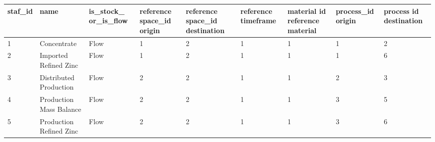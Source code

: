\documentclass[ %
                    author={Tom Jager},
                supervisor={Dr. Daniel Schien},
                    degree={MEng},
                     title={A Bayesian Inference Engine for Calibrating Uncertainty over UMIS Structured MFA Systems},
                  subtitle={},
                      type={research},
                      year={2019} ]{dissertation}
\begin{document}
\begin{table}[]
\scriptsize
\begin{tabular}{|p{1.1cm}|p{2cm}|p{1.5cm}|p{1.5cm}|p{1.5cm}|p{1.5cm}|p{1.5cm}|p{1.6cm}|p{1.5cm}|}
\hline 
{ \textbf{staf\_id}} & { \textbf{name}}                       & {\textbf{is\_stock\_ or\_is\_flow}} & { \textbf{reference space\_id origin}} & { \textbf{reference space\_id destination}} & { \textbf{reference timeframe}} & { \textbf{material id reference material}} & { \textbf{process\_id origin}} & { \textbf{process id destination}} \\ \hline
1                       & Concentrate                               & Flow                                   & 1                                           & 2                                                & 1                                   & 1                                                & 1                                  & 2                                       \\ \hline
2                       & Imported Refined Zinc                     & Flow                                   & 1                                           & 2                                                & 1                                   & 1                                                & 1                                  & 6                                       \\ \hline
3                       & Distributed Production                    & Flow                                   & 2                                           & 2                                                & 1                                   & 1                                                & 2                                  & 3                                       \\ \hline
4                       & Production Mass Balance                   & Flow                                   & 2                                           & 2                                                & 1                                   & 1                                                & 3                                  & 5                                       \\ \hline
5                       & Production Refined Zinc                   & Flow                                   & 2                                           & 2                                                & 1                                   & 1                                                & 3                                  & 6                                       \\ \hline

\end{tabular}
\end{table}
\end{document}
